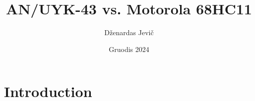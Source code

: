 \documentclass{article}
\title{AN/UYK-43 vs. Motorola 68HC11}
\author{Dženardas Jevič}
\date{Gruodis 2024}
\begin{document}
\maketitle

\section{Introduction}
\end{document}
